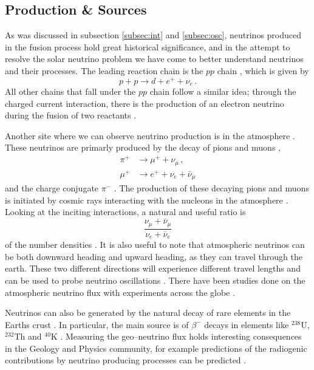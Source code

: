 \subsection{Production \& Sources}

As was discussed in subsection \ref{subsec:int} and \ref{subsec:osc}, neutrinos produced in the fusion process hold great historical significance, and in the attempt to resolve the solar neutrino problem we have come to better understand neutrinos and their processes. The leading reaction chain is the $pp$ chain \cite{pdg,solar_nu}, which is given by \cite{pdg}
\begin{equation}
  p + p \to d + e^{+} + \nu_{e} \, .
\end{equation}
All other chains that fall under the $pp$ chain follow a similar idea; through the charged current interaction, there is the production of an electron neutrino during the fusion of two reactants \cite{pdg}.

Another site where we can observe neutrino production is in the atmosphere \cite{atm_nu,pdg,volk_atm}. These neutrinos are primarly produced by the decay of pions and muons \cite{pdg},
\begin{align}
  \pi^{+} & \to \mu^{+} + \nu_{\mu}\, , \\
  \mu^{+} & \to e^{+} + \nu_{e} + \bar{\nu}_{\mu}
\end{align}
and the charge conjugate $\pi^{-}$ \cite{pdg}. The production of these decaying pions and muons is initiated by cosmic rays interacting with the nucleons in the atmosphere \cite{atm_nu,pdg,volk_atm}. Looking at the inciting interactions, a natural and useful ratio is 
\begin{equation}
  \frac{\nu_{\mu} + \bar{\nu}_{\mu}}{\nu_{e} + \bar{\nu}_{e}}
\end{equation}
of the number densities \cite{pdg}. It is also useful to note that atmospheric neutrinos can be both downward heading and upward heading, as they can travel through the earth. These two different directions will experience different travel lengths and can be used to probe neutrino oscillations \cite{pdg}. There have been studies done on the atmospheric neutrino flux with experiments across the globe \cite{pdg, volk_atm}.

Neutrinos can also be generated by the natural decay of rare elements in the Earths crust \cite{geo_nu}. In particular, the main source is of $\beta^{-}$ decays in elements like $^{238}$U, $^{232}$Th and $^{40}$K \cite{geo_nu}. Measuring the geo--neutrino flux holds interesting consequences in the Geology and Physics community, for example predictions of the radiogenic contributions by neutrino producing processes can be predicted \cite{geo_nu}.

